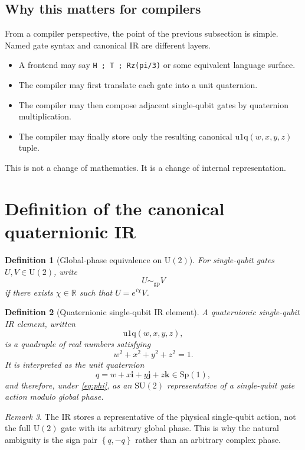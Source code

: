 \documentclass[11pt]{article}
\newtheorem{definition}{Definition}[section]
\theoremstyle{remark}
\newtheorem{remark}[definition]{Remark}
\newcommand{\R}{\mathbb{R}}
\newcommand{\SU}{\mathrm{SU}}
\newcommand{\U}{\mathrm{U}}
\newcommand{\ii}{\mathbf{i}}
\newcommand{\jj}{\mathbf{j}}
\newcommand{\kk}{\mathbf{k}}
\newcommand{\set}[1]{\left\{ #1 \right\}}
\newcommand{\uoneq}{\mathrm{u1q}}
\begin{document}
\subsection{Why this matters for compilers}

From a compiler perspective, the point of the previous subsection is simple.
Named gate syntax and canonical IR are different layers.

\begin{itemize}[leftmargin=1.5em]
\item A frontend may say \texttt{H ; T ; Rz(pi/3)} or some equivalent language
surface.
\item The compiler may first translate each gate into a unit quaternion.
\item The compiler may then compose adjacent single-qubit gates by quaternion
multiplication.
\item The compiler may finally store only the resulting canonical
$\uoneq(w,x,y,z)$ tuple.
\end{itemize}

This is not a change of mathematics. It is a change of internal
representation.

\section{Definition of the canonical quaternionic IR}

\begin{definition}[Global-phase equivalence on $\U(2)$]
For single-qubit gates $U,V\in\U(2)$, write
\[
U\sim_{\mathrm{gp}} V
\]
if there exists $\chi\in\R$ such that $U=e^{i\chi}V$.
\end{definition}

\begin{definition}[Quaternionic single-qubit IR element]
A \emph{quaternionic single-qubit IR element}, written
\[
\uoneq(w,x,y,z),
\]
is a quadruple of real numbers satisfying
\[
w^2+x^2+y^2+z^2=1.
\]
It is interpreted as the unit quaternion
\[
q=w+x\ii+y\jj+z\kk\in\mathrm{Sp}(1),
\]
and therefore, under \eqref{eq:phi}, as an $\SU(2)$ representative of a
single-qubit gate action modulo global phase.
\end{definition}

\begin{remark}
The IR stores a representative of the physical single-qubit action, not the
full $\U(2)$ gate with its arbitrary global phase. This is why the natural
ambiguity is the sign pair $\set{q,-q}$ rather than an arbitrary complex
phase.
\end{remark}
\end{document}
